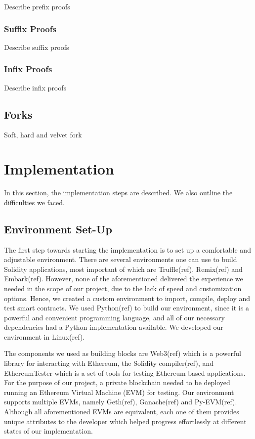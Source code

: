 \documentclass{article}
\begin{document}
  Describe prefix proofs

  \subsubsection{Suffix Proofs}

  Describe suffix proofs

  \subsubsection{Infix Proofs}

  Describe infix proofs

  \subsection{Forks}

  Soft, hard and velvet fork

  \pagebreak

  \section{Implementation}

  In this section, the implementation steps are described. We also
  outline the difficulties we faced.

  \subsection{Environment Set-Up}
  The first step towards starting the
  implementation is to set up a comfortable and adjustable environment.
  There are several environments one can use to build Solidity
  applications, most important of which are Truffle(ref), Remix(ref) and
  Embark(ref). However, none of the aforementioned delivered the
  experience we needed in the scope of our project, due to the lack of
  speed and customization options. Hence, we created a custom
  environment to import, compile, deploy and test smart contracts. We
  used Python(ref) to build our environment, since it is a powerful and
  convenient programming language, and all of our necessary dependencies
  had a Python implementation available. We developed our environment in
  Linux(ref).

  The components we used as building blocks are Web3(ref) which is a
  powerful library for interacting with Ethereum, the Solidity
  compiler(ref), and EthereumTester which is a set of tools for testing
  Ethereum-based applications. For the purpose of our project, a private
  blockchain needed to be deployed running an Ethereum Virtual Machine
  (EVM) for testing. Our environment supports multiple EVMs, namely
  Geth(ref), Ganache(ref) and Py-EVM(ref). Although all aforementioned
  EVMs are equivalent, each one of them provides unique attributes to
  the developer which helped progress effortlessly at different states
  of our implementation.
\end{document}
